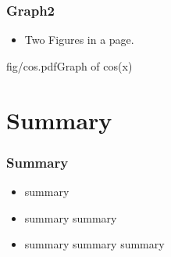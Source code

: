\documentclass[12pt]{beamer}
\begin{document}
\begin{frame}
  \frametitle{Graph2}

  \begin{itemize}
    \item Two Figures in a page.
  \end{itemize}

            {fig/cos.pdf}{Graph of cos(x)}

\end{frame}

\section{Summary}

\begin{frame}
  \frametitle{Summary}

  \begin{itemize}
    \item summary 
    \item summary summary
    \item summary summary summary
  \end{itemize}

\end{frame}
\end{document}

